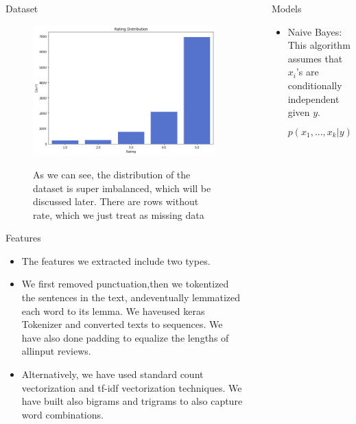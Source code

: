 \documentclass[final]{beamer}
\newlength{\sepwid}
\newlength{\onecolwid}
\begin{document}
\begin{frame}[t]
\begin{columns}[t]
\begin{column}{\onecolwid}
\begin{block}{Dataset}
\begin{itemize}
\begin{figure}
\raggedright
	\includegraphics[width=0.6\linewidth, height=0.35\textheight, keepaspectratio]{figure1.png}
	\label{fig:feature_imp}
\item As we can see, the distribution of the dataset is super imbalanced, which will be discussed
later. There are rows without rate, which we just treat as missing data
\end{figure}





\end{itemize}
\end{block}

\begin{block}{Features}

\begin{itemize}

\item The features we extracted include two types.
\item We  first  removed  punctuation,then  we  tokentized  the  sentences  in  the  text,   andeventually lemmatized each word to its lemma. We haveused keras Tokenizer and converted texts to sequences. We have also done padding to equalize the lengths of allinput reviews. 
\item Alternatively, we have used standard count vectorization and tf-idf vectorization techniques. We have built also bigrams and trigrams to also capture word combinations. 

\end{itemize}
\end{block}

\end{column} %

\begin{column}{\sepwid}\end{column} %

\begin{column}{\onecolwid} %
\begin{block}{Models}
\begin{itemize}
\item Naive Bayes:
This algorithm assumes that $x_i$'s are conditionally independent given $y$.
\[p(x_1,...,x_k|y)=\prod_{i=1}^{k} p(x_i|y)\]



\end{itemize}
\end{block}
\end{column}
\end{columns}
\end{frame}
\end{document}
